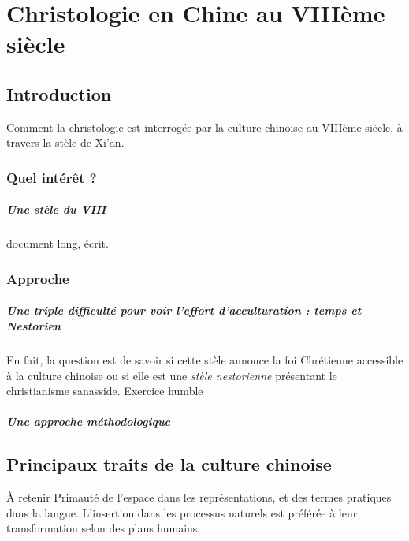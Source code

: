 \chapter{Christologie en Chine au VIIIème siècle}



\section{Introduction}

Comment la christologie est interrogée par la culture chinoise au VIIIème siècle, à travers la stèle de Xi'an.

\subsection{Quel intérêt ?}
\paragraph{Une stèle du VIII} document long, écrit. 





\subsection{Approche}
\paragraph{Une triple difficulté pour voir l'effort d'acculturation : temps et Nestorien} En fait, la question est de savoir si cette stèle annonce la foi Chrétienne accessible à la culture chinoise ou si elle est une \textit{stèle nestorienne} présentant le christianisme sanasside. Exercice humble

\paragraph{Une approche méthodologique}



\section{Principaux traits de la culture chinoise}


\begin{Synthesis}
À retenir Primauté de l’espace dans les représentations, et des termes pratiques dans la langue. L’insertion dans les processus naturels est préférée à leur transformation selon des plans humains.
\end{Synthesis}

